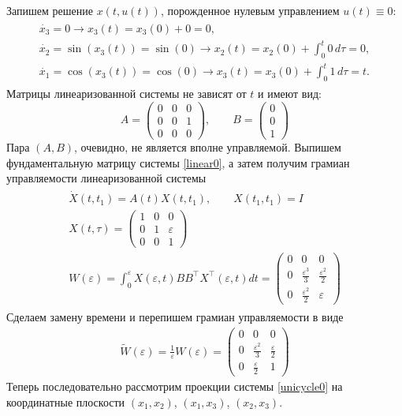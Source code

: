 \documentclass[../main.tex]{subfiles}
\begin{document}
	Запишем решение $ x(t,u(t)) $, порожденное нулевым управлением $ u(t) \equiv 0 $:
	\begin{gather*}
		\begin{gathered}
			\dot{x_3} = 0 \longrightarrow x_3(t) = x_3(0) + 0 = 0, \\
			\dot{x_2} = \sin(x_3(t)) = \sin(0) \longrightarrow x_2(t) = x_2(0) + \int_0^t 0 \, d\tau = 0,\\
			\dot{x_1} = \cos(x_3(t)) = \cos(0) \longrightarrow x_3(t) = x_3(0) + \int_0^t	1 \, d\tau = t.
		\end{gathered}
	\end{gather*}
	Матрицы линеаризованной системы не зависят от $ t $ и имеют вид:
	\begin{equation}\label{linear0}
		A = \begin{pmatrix}
			0 & 0 & 0 \\ 
			0 & 0 & 1 \\ 
			0 & 0 & 0
		\end{pmatrix}, \qquad  B = \begin{pmatrix}
			0 \\ 
			0 \\ 
			1
		\end{pmatrix} 
	\end{equation}
	Пара $ (A,B) $, очевидно, не является вполне управляемой.
	Выпишем фундаментальную матрицу системы \eqref{linear0}, а затем получим грамиан управляемости линеаризованной системы
	\begin{gather*}
		\begin{gathered}
			\dot{X}(t,t_1) = A(t) X(t,t_1), \qquad X(t_1,t_1) = I \\
			X(t,\tau) = \begin{pmatrix}
				1 & 0 & 0 \\ 
				0 & 1 & \varepsilon \\ 
				0 & 0 & 1
			\end{pmatrix}  \\
			W(\varepsilon) = \int_0^{\varepsilon}X(\varepsilon,t) B B^{\top} X^{\top}(\varepsilon,t)dt 
			=\begin{pmatrix}
				0 & 0 & 0 \\
				0 & \frac{\varepsilon^3}{3} & \frac{\varepsilon^2}{2} \\
				0 &  \frac{\varepsilon^2}{2} & \varepsilon
			\end{pmatrix} 
		\end{gathered}
	\end{gather*}
	Сделаем замену времени и перепишем грамиан управляемости в виде
	\begin{gather*}
		\widetilde{W}(\varepsilon) = \frac{1}{\varepsilon}W(\varepsilon) 	=\begin{pmatrix}
			0 & 0 & 0 \\
			0 & \frac{\varepsilon^2}{3} & \frac{\varepsilon}{2} \\
			0 &  \frac{\varepsilon}{2} & 1
		\end{pmatrix} 
	\end{gather*} 
	Теперь последовательно рассмотрим проекции системы \eqref{unicycle0} на координатные плоскости $ (x_1, x_2) $, $ (x_1, x_3) $, $ (x_2, x_3) $. \\
	
\end{document}
